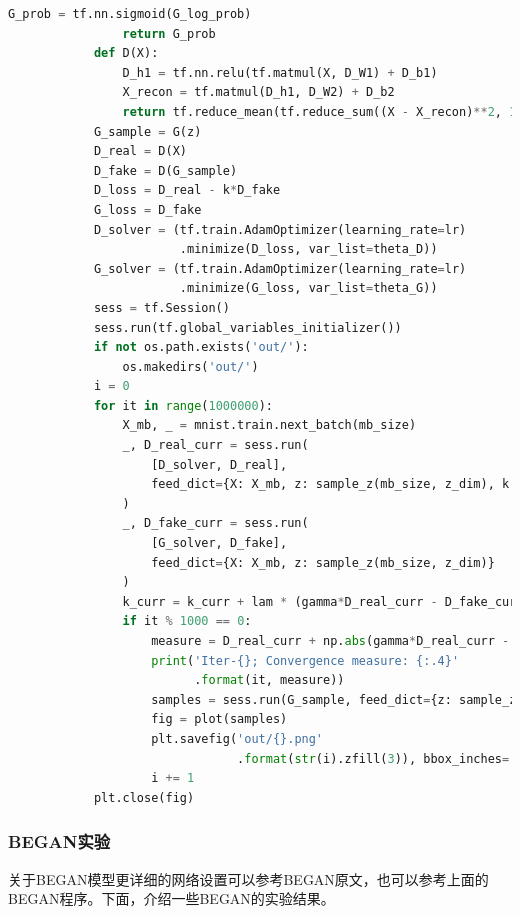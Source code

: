 \begin{lstlisting}[language = Python]
                G_prob = tf.nn.sigmoid(G_log_prob)
                return G_prob
            def D(X):
                D_h1 = tf.nn.relu(tf.matmul(X, D_W1) + D_b1)
                X_recon = tf.matmul(D_h1, D_W2) + D_b2
                return tf.reduce_mean(tf.reduce_sum((X - X_recon)**2, 1))
            G_sample = G(z)
            D_real = D(X)
            D_fake = D(G_sample)
            D_loss = D_real - k*D_fake
            G_loss = D_fake
            D_solver = (tf.train.AdamOptimizer(learning_rate=lr)
                        .minimize(D_loss, var_list=theta_D))
            G_solver = (tf.train.AdamOptimizer(learning_rate=lr)
                        .minimize(G_loss, var_list=theta_G))
            sess = tf.Session()
            sess.run(tf.global_variables_initializer())
            if not os.path.exists('out/'):
                os.makedirs('out/')
            i = 0
            for it in range(1000000):
                X_mb, _ = mnist.train.next_batch(mb_size)
                _, D_real_curr = sess.run(
                    [D_solver, D_real],
                    feed_dict={X: X_mb, z: sample_z(mb_size, z_dim), k: k_curr}
                )
                _, D_fake_curr = sess.run(
                    [G_solver, D_fake],
                    feed_dict={X: X_mb, z: sample_z(mb_size, z_dim)}
                )
                k_curr = k_curr + lam * (gamma*D_real_curr - D_fake_curr)
                if it % 1000 == 0:
                    measure = D_real_curr + np.abs(gamma*D_real_curr - D_fake_curr)
                    print('Iter-{}; Convergence measure: {:.4}'
                          .format(it, measure))
                    samples = sess.run(G_sample, feed_dict={z: sample_z(16, z_dim)})
                    fig = plot(samples)
                    plt.savefig('out/{}.png'
                                .format(str(i).zfill(3)), bbox_inches='tight')
                    i += 1
            plt.close(fig)
            \end{lstlisting}
        \subsubsection{BEGAN实验}
            \par
            关于BEGAN模型更详细的网络设置可以参考BEGAN原文，也可以参考上面的BEGAN程序。下面，介绍一些BEGAN的实验结果。
